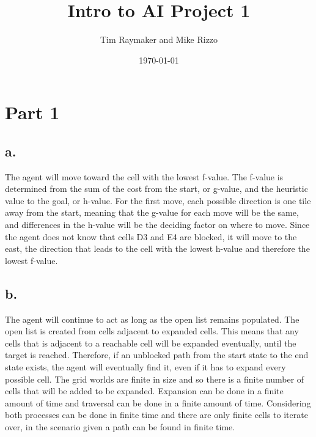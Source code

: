 \documentclass[a4paper,12pt]{article}
\begin{document}
\title{Intro to AI Project 1}
\author{Tim Raymaker and Mike Rizzo}
\date{\today}
\maketitle
\section{Part 1}
\subsection{a.}
The agent will move toward the cell with the lowest f-value. The f-value is determined from the sum of the cost from the start, or g-value,  and the heuristic value to the goal, or h-value. For the first move, each possible direction is one tile away from the start, meaning that the g-value for each move will be the same, and differences in the h-value will be the deciding factor on where to move. Since the agent does not know that cells D3 and E4 are blocked, it will move to the east, the direction that leads to the cell with the lowest h-value and therefore the lowest f-value. 
\subsection{b.}
The agent will continue to act as long as the open list remains populated. The open list is created from cells adjacent to expanded cells. This means that any cells that is adjacent to a reachable cell will be expanded eventually, until the target is reached. Therefore, if an unblocked path from the start state to the end state exists, the agent will eventually find it, even if it has to expand every possible cell. The grid worlds are finite in size and so there is a finite number of cells that will be added to be expanded. Expansion can be done in a finite amount of time and traversal can be done in a finite amount of time. Considering both processes can be done in finite time and there are only finite cells to iterate over, in the scenario given a path can be found in finite time. 
\end{document}
